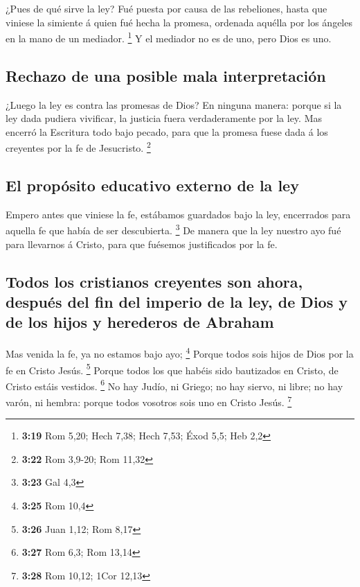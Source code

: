  ¿Pues de qué sirve la ley? Fué puesta por causa de las
rebeliones, hasta que viniese la simiente á quien fué hecha la promesa,
ordenada aquélla por los ángeles en la mano de un mediador. \footnote{\textbf{3:19}
  Rom 5,20; Hech 7,38; Hech 7,53; Éxod 5,5; Heb 2,2}  Y el
mediador no es de uno, pero Dios es uno.

\hypertarget{rechazo-de-una-posible-mala-interpretaciuxf3n}{%
\subsection{Rechazo de una posible mala
interpretación}\label{rechazo-de-una-posible-mala-interpretaciuxf3n}}

 ¿Luego la ley es contra las promesas de Dios? En ninguna
manera: porque si la ley dada pudiera vivificar, la justicia fuera
verdaderamente por la ley.  Mas encerró la Escritura todo
bajo pecado, para que la promesa fuese dada á los creyentes por la fe de
Jesucristo. \footnote{\textbf{3:22} Rom 3,9-20; Rom 11,32}

\hypertarget{el-propuxf3sito-educativo-externo-de-la-ley}{%
\subsection{El propósito educativo externo de la
ley}\label{el-propuxf3sito-educativo-externo-de-la-ley}}

 Empero antes que viniese la fe, estábamos guardados bajo
la ley, encerrados para aquella fe que había de ser descubierta.
\footnote{\textbf{3:23} Gal 4,3}  De manera que la ley
nuestro ayo fué para llevarnos á Cristo, para que fuésemos justificados
por la fe.

\hypertarget{todos-los-cristianos-creyentes-son-ahora-despuuxe9s-del-fin-del-imperio-de-la-ley-de-dios-y-de-los-hijos-y-herederos-de-abraham}{%
\subsection{Todos los cristianos creyentes son ahora, después del fin
del imperio de la ley, de Dios y de los hijos y herederos de
Abraham}\label{todos-los-cristianos-creyentes-son-ahora-despuuxe9s-del-fin-del-imperio-de-la-ley-de-dios-y-de-los-hijos-y-herederos-de-abraham}}

 Mas venida la fe, ya no estamos bajo ayo; \footnote{\textbf{3:25}
  Rom 10,4}  Porque todos sois hijos de Dios por la fe en
Cristo Jesús. \footnote{\textbf{3:26} Juan 1,12; Rom 8,17} 
Porque todos los que habéis sido bautizados en Cristo, de Cristo estáis
vestidos. \footnote{\textbf{3:27} Rom 6,3; Rom 13,14}  No
hay Judío, ni Griego; no hay siervo, ni libre; no hay varón, ni hembra:
porque todos vosotros sois uno en Cristo Jesús. \footnote{\textbf{3:28}
  Rom 10,12; 1Cor 12,13}

